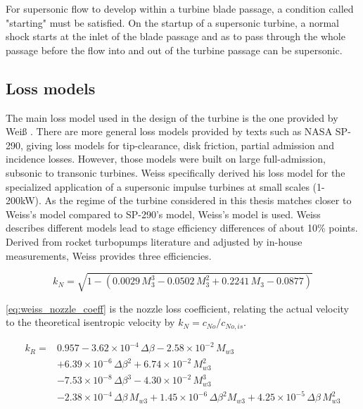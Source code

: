 For supersonic flow to develop within a turbine blade passage, a condition called "starting" must be satisfied. On the startup of a supersonic turbine, a normal shock starts at the inlet of the blade passage and as to pass through the whole passage before the flow into and out of the turbine passage can be supersonic. 


\subsection{Loss models}
\label{subsec:weissloss}

The main loss model used in the design of the turbine is the one provided by Weiß \cite{weiss}. There are more general loss models provided by texts such as NASA SP-290, giving loss models for tip-clearance, disk friction, partial admission and incidence losses. However, those models were built on large full-admission, subsonic to transonic turbines. Weiss specifically derived his loss model for the specialized application of a supersonic impulse turbines at small scales (1-200kW). As the regime of the turbine considered in this thesis matches closer to Weiss's model compared to SP-290's model, Weiss's model is used. Weiss describes different models lead to stage efficiency differences of about 10\% points. Derived from rocket turbopumps literature and adjusted by in-house measurements, Weiss provides three efficiencies.


\begin{equation}
    k_N = \sqrt{1 - \left( 0.0029\,M_3^3 - 0.0502\,M_3^2 + 0.2241\,M_3 - 0.0877 \right)}
    \label{eq:weiss_nozzle_coeff}
\end{equation}

\cref{eq:weiss_nozzle_coeff} is the nozzle loss coefficient, relating the actual velocity to the theoretical isentropic velocity by $k_N=c_{No}/c_{No,is}$. 

\begin{equation}
    \begin{aligned}
        k_R ={}& 0.957
            - 3.62\times10^{-4}\,\Delta\beta
            - 2.58\times10^{-2}\,M_{w3} \\
            &+ 6.39\times10^{-6}\,\Delta\beta^2
            + 6.74\times10^{-2}\,M_{w3}^2 \\
            &- 7.53\times10^{-8}\,\Delta\beta^3
            - 4.30\times10^{-2}\,M_{w3}^3 \\
            &- 2.38\times10^{-4}\,\Delta\beta\, M_{w3}
            + 1.45\times10^{-6}\,\Delta\beta^2 M_{w3}
            + 4.25\times10^{-5}\,\Delta\beta\, M_{w3}^2
    \end{aligned}
    \label{eq:weiss_rotor_coeff}
\end{equation}


